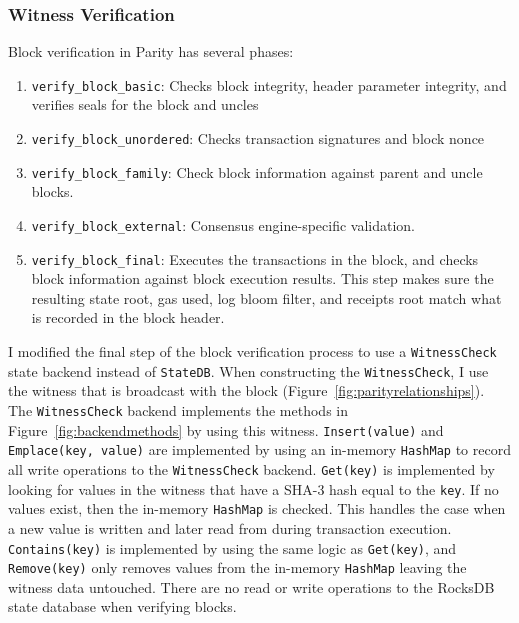 \documentclass[12pt]{article}
\begin{document}
\subsubsection{Witness Verification}

Block verification in Parity has several phases:
\begin{enumerate}
  \item \texttt{verify\_block\_basic}: Checks block integrity, header parameter integrity, and verifies seals for the block and uncles
  \item \texttt{verify\_block\_unordered}: Checks transaction signatures and block nonce
  \item \texttt{verify\_block\_family}: Check block information against parent and uncle blocks.
  \item \texttt{verify\_block\_external}: Consensus engine-specific validation.
  \item \texttt{verify\_block\_final}: Executes the transactions in the block, and checks block information against block execution results. This step makes sure the resulting state root, gas used, log bloom filter, and receipts root match what is recorded in the block header.
\end{enumerate}

I modified the final step of the block verification process to use a \texttt{WitnessCheck} state backend instead of \texttt{StateDB}. When constructing the \texttt{WitnessCheck}, I use the witness that is broadcast with the block (Figure~\ref{fig:parityrelationships}). The \texttt{WitnessCheck} backend implements the methods in Figure~\ref{fig:backendmethods} by using this witness. \texttt{Insert(value)} and \texttt{Emplace(key, value)} are implemented by using an in-memory \texttt{HashMap} to record all write operations to the \texttt{WitnessCheck} backend. \texttt{Get(key)} is implemented by looking for values in the witness that have a SHA-3 hash equal to the \texttt{key}. If no values exist, then the in-memory \texttt{HashMap} is checked. This handles the case when a new value is written and later read from during transaction execution. \texttt{Contains(key)} is implemented by using the same logic as \texttt{Get(key)}, and \texttt{Remove(key)} only removes values from the in-memory \texttt{HashMap} leaving the witness data untouched. There are no read or write operations to the RocksDB state database when verifying blocks.
\end{document}
